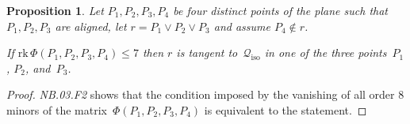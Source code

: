 \documentclass[a4paper, 11pt, reqno]{amsart}
\theoremstyle{plain}
\newtheorem{prop}[lemma]{Proposition}
\theoremstyle{definition}
\newtheorem{rmk}[lemma]{Remark}
\newcommand{\nb}[2]{\textsl{{NB}.{#1}.{#2}}}
\newcommand{\rk}{\ensuremath{\mathrm{rk}}}
\newcommand{\iso}{\mathcal{Q}_{\mathrm{iso}}}
\begin{document}
\begin{prop}
\label{proposition:three_aligned_plus_one}
Let $P_1, P_2, P_3, P_4$ be four distinct points of the plane such that
$P_1, P_2, P_3$ are aligned, let $r = P_1 \vee P_2 \vee P_3$ and assume $P_4 \not \in r$.

If $\rk \,\Phi(P_1, P_2, P_3, P_4) \leq 7$ then $r$ is tangent to~$\iso$ in one of the three points~$P_1$, $P_2$, and~$P_3$.
\end{prop}
\begin{proof}
\nb{03}{F2} shows that the condition imposed by the vanishing of all order $8$ minors of the matrix~$\Phi(P_1, P_2, P_3, P_4)$ is equivalent to the statement.
\end{proof}



\end{document}
